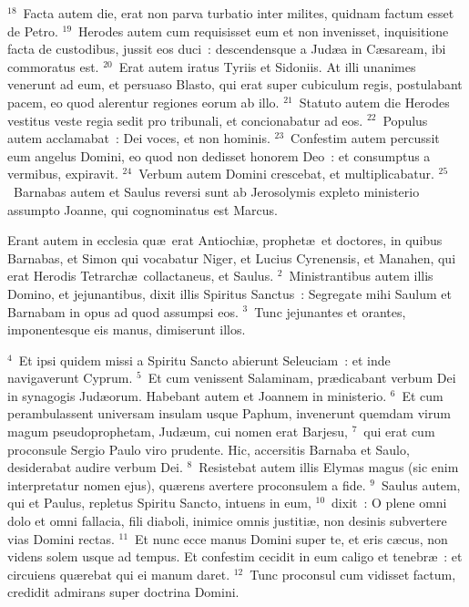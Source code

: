 ${}^{18}$~Facta autem die, erat non parva turbatio inter milites, quidnam factum esset de Petro.
${}^{19}$~Herodes autem cum requisisset eum et non invenisset, inquisitione facta de custodibus, jussit eos duci~: descendensque a Jud\ae a in C\ae saream, ibi commoratus est.
${}^{20}$~Erat autem iratus Tyriis et Sidoniis. At illi unanimes venerunt ad eum, et persuaso Blasto, qui erat super cubiculum regis, postulabant pacem, eo quod alerentur regiones eorum ab illo.
${}^{21}$~Statuto autem die Herodes vestitus veste regia sedit pro tribunali, et concionabatur ad eos.
${}^{22}$~Populus autem acclamabat~: Dei voces, et non hominis.
${}^{23}$~Confestim autem percussit eum angelus Domini, eo quod non dedisset honorem Deo~: et consumptus a vermibus, expiravit.
${}^{24}$~Verbum autem Domini crescebat, et multiplicabatur.
${}^{25}$~Barnabas autem et Saulus reversi sunt ab Jerosolymis expleto ministerio assumpto Joanne, qui cognominatus est Marcus.

\lettrine[lines=3,image=true,loversize=0.05,lraise=-0.03]{E}{}rant autem in ecclesia qu\ae\ erat Antiochi\ae , prophet\ae\ et doctores, in quibus Barnabas, et Simon qui vocabatur Niger, et Lucius Cyrenensis, et Manahen, qui erat Herodis Tetrarch\ae\ collactaneus, et Saulus.
${}^{2}$~Ministrantibus autem illis Domino, et jejunantibus, dixit illis Spiritus Sanctus~: Segregate mihi Saulum et Barnabam in opus ad quod assumpsi eos.
${}^{3}$~Tunc jejunantes et orantes, imponentesque eis manus, dimiserunt illos.


${}^{4}$~Et ipsi quidem missi a Spiritu Sancto abierunt Seleuciam~: et inde navigaverunt Cyprum.
${}^{5}$~Et cum venissent Salaminam, pr\ae dicabant verbum Dei in synagogis Jud\ae orum. Habebant autem et Joannem in ministerio.
${}^{6}$~Et cum perambulassent universam insulam usque Paphum, invenerunt quemdam virum magum pseudoprophetam, Jud\ae um, cui nomen erat Barjesu,
${}^{7}$~qui erat cum proconsule Sergio Paulo viro prudente. Hic, accersitis Barnaba et Saulo, desiderabat audire verbum Dei.
${}^{8}$~Resistebat autem illis Elymas magus (sic enim interpretatur nomen ejus), qu\ae rens avertere proconsulem a fide.
${}^{9}$~Saulus autem, qui et Paulus, repletus Spiritu Sancto, intuens in eum,
${}^{10}$~dixit~: O plene omni dolo et omni fallacia, fili diaboli, inimice omnis justiti\ae , non desinis subvertere vias Domini rectas.
${}^{11}$~Et nunc ecce manus Domini super te, et eris c\ae cus, non videns solem usque ad tempus. Et confestim cecidit in eum caligo et tenebr\ae~: et circuiens qu\ae rebat qui ei manum daret.
${}^{12}$~Tunc proconsul cum vidisset factum, credidit admirans super doctrina Domini.



